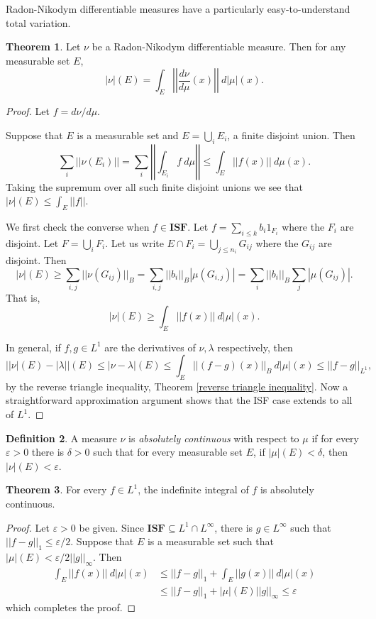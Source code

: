 \documentclass[12pt]{book}
\newcommand{\ISF}{\mathbf{ISF}}
\newcommand{\dfn}[1]{\emph{#1}\index{#1}}
\theoremstyle{definition}
\newtheorem{theorem}{Theorem}[section]
\newtheorem{definition}[theorem]{Definition}
\begin{document}
Radon-Nikodym differentiable measures have a particularly easy-to-understand total variation.
\begin{theorem}
Let $\nu$ be a Radon-Nikodym differentiable measure. Then for any measurable set $E$,
$$|\nu|(E) = \int_E \left|\left|\frac{d\nu}{d\mu}(x)\right|\right|~d|\mu|(x).$$
\end{theorem}
\begin{proof}
Let $f = d\nu/d\mu$.

Suppose that $E$ is a measurable set and $E = \bigcup_i E_i$, a finite disjoint union. Then
$$\sum_i ||\nu(E_i)|| = \sum_i \left|\left| \int_{E_i} f~d\mu\right|\right| \leq \int_E ||f(x)||~d\mu(x).$$
Taking the supremum over all such finite disjoint unions we see that $|\nu|(E) \leq \int_E ||f||$.

We first check the converse when $f \in \ISF$. Let $f = \sum_{i \leq k} b_i 1_{F_i}$ where the $F_i$ are disjoint.
Let $F = \bigcup_i F_i$.
Let us write $E \cap F_i = \bigcup_{j \leq n_i} G_{ij}$ where the $G_{ij}$ are disjoint. Then
$$|\nu|(E) \geq \sum_{i,j} ||\nu(G_{ij})||_B = \sum_{i,j} ||b_i||_B |\mu(G_{i,j})| = \sum_i ||b_i||_B \sum_j |\mu(G_{ij})|.$$
That is,
$$|\nu|(E) \geq \int_E ||f(x)|| ~d|\mu|(x).$$

In general, if $f,g \in L^1$ are the derivatives of $\nu,\lambda$ respectively, then
$$||\nu|(E) - |\lambda||(E) \leq |\nu - \lambda|(E) \leq \int_E ||(f - g)(x)||_B ~d|\mu|(x) \leq ||f - g||_{L^1},$$
by the reverse triangle inequality, Theorem \ref{reverse triangle inequality}.
Now a straightforward approximation argument shows that the ISF case extends to all of $L^1$.
\end{proof}

\begin{definition}
A measure $\nu$ is \dfn{absolutely continuous} with respect to $\mu$ if for every $\varepsilon > 0$ there is $\delta > 0$ such that for every measurable set $E$, if $|\mu|(E) < \delta$, then $|\nu|(E) < \varepsilon$.
\end{definition}

\begin{theorem}
\label{indefinite integral is abs cts}
For every $f \in L^1$, the indefinite integral of $f$ is absolutely continuous.
\end{theorem}
\begin{proof}
Let $\varepsilon > 0$ be given.
Since $\ISF \subseteq L^1 \cap L^\infty$, there is $g \in L^\infty$ such that $||f - g||_1 \leq \varepsilon/2$.
Suppose that $E$ is a measurable set such that $|\mu|(E) < \varepsilon/2||g||_\infty$. Then
\begin{align*}
\int_E ||f(x)|| ~d|\mu|(x) &\leq ||f - g||_1 + \int_E ||g(x)|| ~d|\mu|(x) \\
&\leq ||f - g||_1 + |\mu|(E)||g||_\infty \leq \varepsilon
\end{align*}
which completes the proof.
\end{proof}
\end{document}
